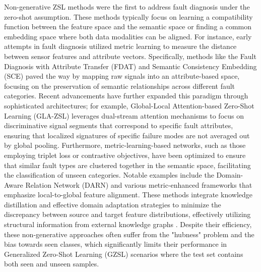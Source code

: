 Non-generative ZSL methods were the first to address fault diagnosis under the zero-shot assumption. These methods typically focus on learning a compatibility function between the feature space and the semantic space or finding a common embedding space where both data modalities can be aligned. For instance, early attempts in fault diagnosis utilized metric learning to measure the distance between sensor features and attribute vectors. Specifically, methods like the Fault Diagnosis with Attribute Transfer (FDAT) and Semantic Consistency Embedding (SCE) paved the way by mapping raw signals into an attribute-based space, focusing on the preservation of semantic relationships across different fault categories. Recent advancements have further expanded this paradigm through sophisticated architectures; for example, Global-Local Attention-based Zero-Shot Learning (GLA-ZSL) leverages dual-stream attention mechanisms to focus on discriminative signal segments that correspond to specific fault attributes, ensuring that localized signatures of specific failure modes are not averaged out by global pooling. Furthermore, metric-learning-based networks, such as those employing triplet loss or contrastive objectives, have been optimized to ensure that similar fault types are clustered together in the semantic space, facilitating the classification of unseen categories. Notable examples include the Domain-Aware Relation Network (DARN) and various metric-enhanced frameworks that emphasize local-to-global feature alignment. These methods integrate knowledge distillation and effective domain adaptation strategies to minimize the discrepancy between source and target feature distributions, effectively utilizing structural information from external knowledge graphs \cite{Chen2023DARN, Fan2024metric, Zhang2023effective, Liu2025KD, Song2025physical, Xie2025domain}. Despite their efficiency, these non-generative approaches often suffer from the "hubness" problem and the bias towards seen classes, which significantly limits their performance in Generalized Zero-Shot Learning (GZSL) scenarios where the test set contains both seen and unseen samples.

